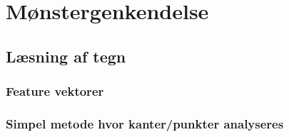 \section{Mønstergenkendelse}
\label{sec_monster}

\begin{comment}
Noter fra møde med Søren 20/2:
Opret feature vektor $f$ for hvert bogstav $\omega$
Finde middelværdivektor for hvert $\omega$.
Afstandsfunktion: den afstand til en middelværdivektor der er mindst, vælges. Dvs. det bogstav vælges.
Featurevektorafstand udregnes hver gang

Euklidisk afstand
En-eller-anden mahap afstand
\end{comment}

\subsection{Læsning af tegn}

\subsubsection{Feature vektorer}

\subsubsection{Simpel metode hvor kanter/punkter analyseres}
